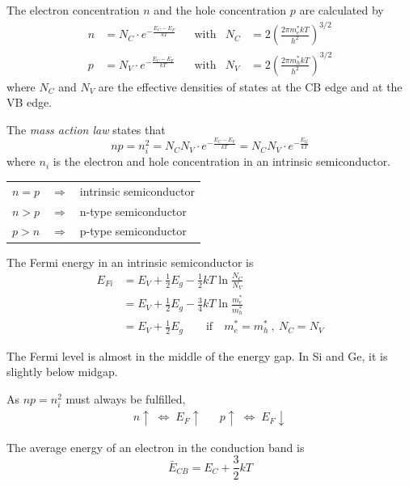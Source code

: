 The electron concentration $n$ and the hole concentration $p$ are calculated by
\begin{align}
    n &= N_C \cdot e^{-\frac{E_C-E_F}{k T}} && \text{with} & N_C &= 2 \left( \frac{2 \pi m_e^* k T}{h^2} \right)^{3/2} \\
    p &= N_V \cdot e^{-\frac{E_C-E_F}{k T}} && \text{with} & N_V &= 2 \left( \frac{2 \pi m_h^* k T}{h^2} \right)^{3/2}
\end{align}
where $N_C$ and $N_V$ are the effective densities of states at the CB edge and at the VB edge.

The \emph{mass action law} states that
\begin{equation}
    n p = n_i^2 = N_C N_V \cdot e^{-\frac{E_C-E_V}{k T}} = N_C N_V \cdot e^{-\frac{E_G}{k T}}
\end{equation}
where $n_i$ is the electron and hole concentration in an intrinsic semiconductor.

\begin{table}[hbp!]
    \centering
    \begin{tabular}{lll}
        $n = p$ & $\Rightarrow$ & intrinsic semiconductor \\
        $n > p$ & $\Rightarrow$ & n-type semiconductor \\
        $p > n$ & $\Rightarrow$ & p-type semiconductor \\
    \end{tabular}
\end{table}

The Fermi energy in an intrinsic semiconductor is
\begin{align}
    E_{Fi} &= E_V + \frac{1}{2} E_g - \frac{1}{2} k T \ln \frac{N_C}{N_V} \\
    &= E_V + \frac{1}{2} E_g - \frac{3}{4} k T \ln \frac{m_e^*}{m_h^*} \\
    &= E_V + \frac{1}{2} E_g \qquad \text{if} \quad m_e^*=m_h^* \:,\: N_C = N_V
\end{align}

The Fermi level is almost in the middle of the energy gap.
In Si and Ge, it is slightly below midgap.


As $np = n_i^2$ must always be fulfilled,
\begin{align*}
    n \uparrow \;\Leftrightarrow\; E_F \uparrow && p \uparrow \;\Leftrightarrow\; E_F \downarrow
\end{align*}

The average energy of an electron in the conduction band is
\begin{equation}
    \bar{E}_{CB} = E_C + \frac{3}{2} kT
\end{equation}

